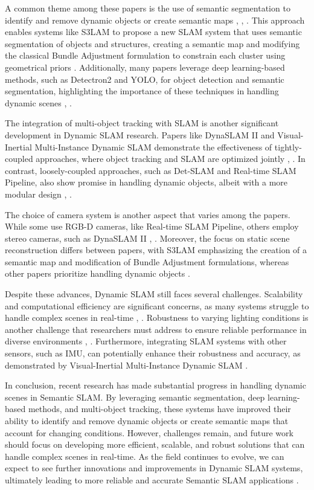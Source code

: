 \documentclass[conference]{IEEEtran}
\begin{document}
A common theme among these papers is the use of semantic segmentation to identify and remove dynamic objects or create semantic maps \cite{b2}, \cite{b3}, \cite{b5}. This approach enables systems like S3LAM to propose a new SLAM system that uses semantic segmentation of objects and structures, creating a semantic map and modifying the classical Bundle Adjustment formulation to constrain each cluster using geometrical priors \cite{b5}. Additionally, many papers leverage deep learning-based methods, such as Detectron2 and YOLO, for object detection and semantic segmentation, highlighting the importance of these techniques in handling dynamic scenes \cite{b2}, \cite{b4}.

The integration of multi-object tracking with SLAM is another significant development in Dynamic SLAM research. Papers like DynaSLAM II and Visual-Inertial Multi-Instance Dynamic SLAM demonstrate the effectiveness of tightly-coupled approaches, where object tracking and SLAM are optimized jointly \cite{b3}, \cite{b6}. In contrast, loosely-coupled approaches, such as Det-SLAM and Real-time SLAM Pipeline, also show promise in handling dynamic objects, albeit with a more modular design \cite{b2}, \cite{b4}.

The choice of camera system is another aspect that varies among the papers. While some use RGB-D cameras, like Real-time SLAM Pipeline, others employ stereo cameras, such as DynaSLAM II \cite{b3}, \cite{b4}. Moreover, the focus on static scene reconstruction differs between papers, with S3LAM emphasizing the creation of a semantic map and modification of Bundle Adjustment formulations, whereas other papers prioritize handling dynamic objects \cite{b5}.

Despite these advances, Dynamic SLAM still faces several challenges. Scalability and computational efficiency are significant concerns, as many systems struggle to handle complex scenes in real-time \cite{b2}, \cite{b3}. Robustness to varying lighting conditions is another challenge that researchers must address to ensure reliable performance in diverse environments \cite{b4}, \cite{b6}. Furthermore, integrating SLAM systems with other sensors, such as IMU, can potentially enhance their robustness and accuracy, as demonstrated by Visual-Inertial Multi-Instance Dynamic SLAM \cite{b6}.

In conclusion, recent research has made substantial progress in handling dynamic scenes in Semantic SLAM. By leveraging semantic segmentation, deep learning-based methods, and multi-object tracking, these systems have improved their ability to identify and remove dynamic objects or create semantic maps that account for changing conditions. However, challenges remain, and future work should focus on developing more efficient, scalable, and robust solutions that can handle complex scenes in real-time. As the field continues to evolve, we can expect to see further innovations and improvements in Dynamic SLAM systems, ultimately leading to more reliable and accurate Semantic SLAM applications \cite{b1}.
\end{document}
